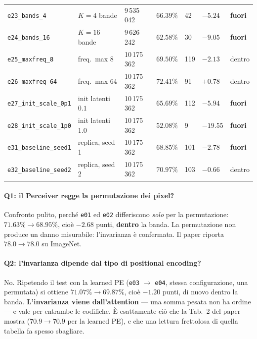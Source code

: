 \documentclass[
  11pt,
]{article}
\begin{document}
\begin{center}
{\begin{tabular}{@{}p{3.1cm}p{3.3cm}p{1.5cm}p{1.2cm}p{0.7cm}p{1.0cm}p{0.9cm}@{}}
\texttt{e23\_bands\_4} & $K{=}4$ bande & 9\,535\,042 & $66.39\%$ & 42 & $-5.24$ & \textbf{fuori} \\
\texttt{e24\_bands\_16} & $K{=}16$ bande & 9\,626\,242 & $62.58\%$ & 30 & $-9.05$ & \textbf{fuori} \\
\texttt{e25\_maxfreq\_8} & freq.\ max $8$ & 10\,175\,362 & $69.50\%$ & 119 & $-2.13$ & dentro \\
\texttt{e26\_maxfreq\_64} & freq.\ max $64$ & 10\,175\,362 & $72.41\%$ & 91 & $+0.78$ & dentro \\
\texttt{e27\_init\_scale\_0p1} & init latenti $0.1$ & 10\,175\,362 & $65.69\%$ & 112 & $-5.94$ & \textbf{fuori} \\
\texttt{e28\_init\_scale\_1p0} & init latenti $1.0$ & 10\,175\,362 & $52.08\%$ & 9 & $-19.55$ & \textbf{fuori} \\
\texttt{e31\_baseline\_seed1} & replica, seed 1 & 10\,175\,362 & $68.85\%$ & 101 & $-2.78$ & \textbf{fuori} \\
\texttt{e32\_baseline\_seed2} & replica, seed 2 & 10\,175\,362 & $70.97\%$ & 103 & $-0.66$ & dentro \\
\bottomrule
\end{tabular}
}
\end{center}

\paragraph{Q1: il Perceiver regge la permutazione dei pixel?}
Confronto pulito, perché \texttt{e01} ed \texttt{e02} differiscono \emph{solo} per la permutazione: $71.63\% \to 68.95\%$, cioè $-2.68$ punti, \textbf{dentro} la banda. La permutazione non produce un danno misurabile: l'invarianza è confermata. Il paper riporta $78.0 \to 78.0$ su ImageNet.

\paragraph{Q2: l'invarianza dipende dal tipo di positional encoding?}
No. Ripetendo il test con la learned PE (\texttt{e03} $\to$ \texttt{e04}, stessa configurazione, una permutata) si ottiene $71.07\% \to 69.87\%$, cioè $-1.20$ punti, di nuovo dentro la banda. \textbf{L'invarianza viene dall'attention} --- una somma pesata non ha ordine --- e vale per entrambe le codifiche. È esattamente ciò che la Tab.~2 del paper mostra ($70.9 \to 70.9$ per la learned PE), e che una lettura frettolosa di quella tabella fa spesso sbagliare.
\end{document}
